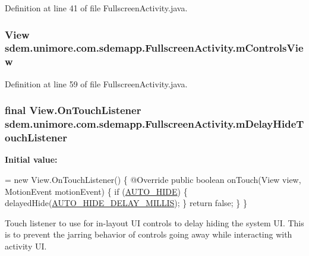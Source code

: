 Definition at line 41 of file Fullscreen\+Activity.\+java.

\hypertarget{classsdem_1_1unimore_1_1com_1_1sdemapp_1_1_fullscreen_activity_a6ee2fd73847cb62532e245338c584285}{
\subsubsection[{m\+Controls\+View}]{\setlength{\rightskip}{0pt plus 5cm}View sdem.\+unimore.\+com.\+sdemapp.\+Fullscreen\+Activity.\+m\+Controls\+View\hspace{0.3cm}{\ttfamily [private]}}}\label{classsdem_1_1unimore_1_1com_1_1sdemapp_1_1_fullscreen_activity_a6ee2fd73847cb62532e245338c584285}


Definition at line 59 of file Fullscreen\+Activity.\+java.

\hypertarget{classsdem_1_1unimore_1_1com_1_1sdemapp_1_1_fullscreen_activity_a04fe84a1508ac134e93696b9a8706af9}{
\subsubsection[{m\+Delay\+Hide\+Touch\+Listener}]{\setlength{\rightskip}{0pt plus 5cm}final View.\+On\+Touch\+Listener sdem.\+unimore.\+com.\+sdemapp.\+Fullscreen\+Activity.\+m\+Delay\+Hide\+Touch\+Listener\hspace{0.3cm}{\ttfamily [private]}}}\label{classsdem_1_1unimore_1_1com_1_1sdemapp_1_1_fullscreen_activity_a04fe84a1508ac134e93696b9a8706af9}
{\bfseries Initial value\+:}
\begin{DoxyCode}
= \textcolor{keyword}{new} View.OnTouchListener() \{
        @Override
        \textcolor{keyword}{public} \textcolor{keywordtype}{boolean} onTouch(View view, MotionEvent motionEvent) \{
            \textcolor{keywordflow}{if} (\hyperlink{classsdem_1_1unimore_1_1com_1_1sdemapp_1_1_fullscreen_activity_a3befdb5b9ed48acbcdcf233e5b4f83f6}{AUTO\_HIDE}) \{
                delayedHide(\hyperlink{classsdem_1_1unimore_1_1com_1_1sdemapp_1_1_fullscreen_activity_af3d1d9220a43ad429f99d5aafff51584}{AUTO\_HIDE\_DELAY\_MILLIS});
            \}
            \textcolor{keywordflow}{return} \textcolor{keyword}{false};
        \}
    \}
\end{DoxyCode}
Touch listener to use for in-\/layout U\+I controls to delay hiding the system U\+I. This is to prevent the jarring behavior of controls going away while interacting with activity U\+I. 

